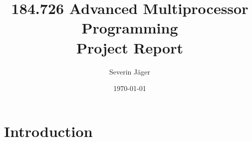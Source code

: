 \documentclass[a4paper, 12t]{article}
\title{184.726 Advanced Multiprocessor Programming\\Project Report}
\author{
  Severin Jäger
}
\date{\today}
\begin{document}
\maketitle
\tableofcontents
\pagebreak

\section{Introduction}


\sloppy
\printbibliography
\end{document}

